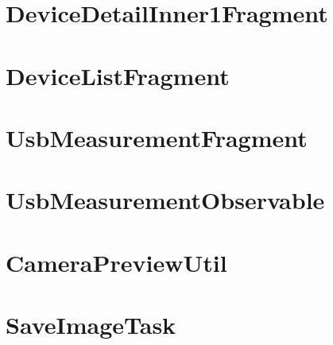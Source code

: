 \newpage
\section{DeviceDetailInner1Fragment}


\newpage
\section{DeviceListFragment}


\newpage
\section{UsbMeasurementFragment}








\newpage
\section{UsbMeasurementObservable}



\newpage
\section{CameraPreviewUtil}






\newpage
\section{SaveImageTask}
